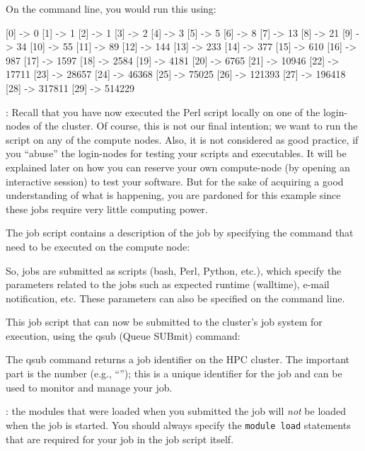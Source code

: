 On the command line, you would run this using:

\begin{prompt}
[0] -> 0
[1] -> 1
[2] -> 1
[3] -> 2
[4] -> 3
[5] -> 5
[6] -> 8
[7] -> 13
[8] -> 21
[9] -> 34
[10] -> 55
[11] -> 89
[12] -> 144
[13] -> 233
[14] -> 377
[15] -> 610
[16] -> 987
[17] -> 1597
[18] -> 2584
[19] -> 4181
[20] -> 6765
[21] -> 10946
[22] -> 17711
[23] -> 28657
[24] -> 46368
[25] -> 75025
[26] -> 121393
[27] -> 196418
[28] -> 317811
[29] -> 514229
\end{prompt}

: Recall that you have now executed the Perl script locally on
one of the login-nodes of the \hpc cluster.  Of course, this is not our final
intention; we want to run the script on any of the compute nodes. Also, it is
not considered as good practice, if you ``abuse'' the login-nodes for testing
your scripts and executables. It will be explained later on how you can
reserve your own compute-node (by opening an interactive session) to test
your software. But for the sake of acquiring a good understanding of what is
happening, you are pardoned for this example since these jobs require very little
computing power.

The job script contains a description of the job by specifying the command that
need to be executed on the compute node:


So, jobs are submitted as scripts (bash, Perl, Python, etc.), which specify the
parameters related to the jobs such as expected runtime (walltime), e-mail
notification, etc. These parameters can also be specified on the command line.

This job script that can now be submitted to the cluster's job system for
execution, using the qsub (Queue SUBmit) command:

\begin{prompt}
\end{prompt}

The qsub command returns a job identifier on the HPC cluster. The important
part is the number (e.g., ``\jobnumber''); this is a unique identifier for the job
and can be used to monitor and manage your job.

: the modules that were loaded when you submitted the job will \emph{not} be loaded
when the job is started. You should always specify the \lstinline|module load| statements that are
required for your job in the job script itself.


